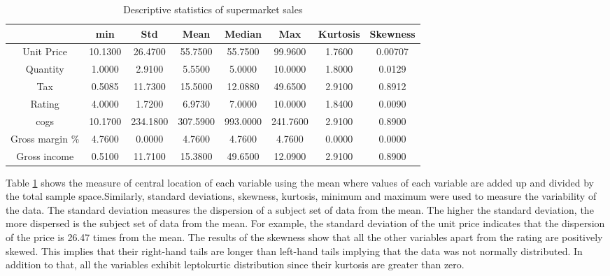 \begin{table}[H]
\centering
\caption{Descriptive statistics of supermarket sales}	
	\begin{tabular}{cccccccc}
		\hline
		& min     & Std      & Mean     & Median   & Max      & Kurtosis & Skewness \\ \hline
		Unit Price      & 10.1300 & 26.4700  & 55.7500  & 55.7500  & 99.9600  & 1.7600   & 0.00707  \\
		Quantity        & 1.0000  & 2.9100   & 5.5500   & 5.0000   & 10.0000  & 1.8000   & 0.0129   \\
		Tax             & 0.5085  & 11.7300  & 15.5000  & 12.0880  & 49.6500  & 2.9100   & 0.8912   \\
		Rating          & 4.0000  & 1.7200   & 6.9730   & 7.0000   & 10.0000  & 1.8400   & 0.0090   \\
		cogs            & 10.1700 & 234.1800 & 307.5900 & 993.0000 & 241.7600 & 2.9100   & 0.8900   \\
		Gross margin \% & 4.7600    & 0.0000   & 4.7600   & 4.7600   & 4.7600   & 0.0000   & 0.0000   \\
		Gross income    & 0.5100    & 11.7100  & 15.3800  & 49.6500  & 12.0900  & 2.9100   & 0.8900   \\ \hline
	\end{tabular}
	\label{table:decriptive}
\end{table}
Table \ref{table:decriptive} shows the measure of central location of each variable using the mean where values of each variable are added up and divided by the total sample space.Similarly, standard deviations, skewness, kurtosis, minimum and maximum were used to measure the variability of the data. The standard deviation measures the dispersion of a subject set of data from the mean. The higher the standard deviation, the more dispersed is the subject set of data from the mean. For example, the standard deviation of the unit price indicates that the dispersion of the price is 26.47 times from the mean. The results of the skewness show that all the other variables apart from the rating are positively skewed. This implies that their right-hand tails are longer than left-hand tails implying that the data was not normally distributed. In addition to that, all the variables exhibit leptokurtic distribution since their kurtosis are greater than zero.

